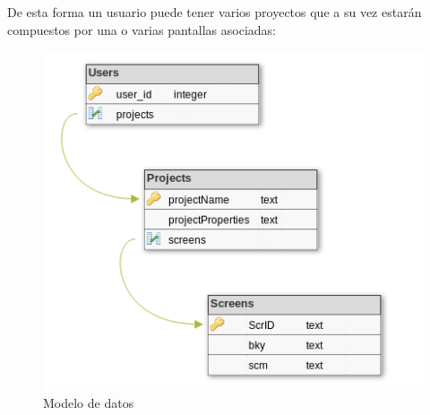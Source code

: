 \documentclass[a4paper, 12pt]{book}
\begin{document}
De esta forma un usuario puede tener varios proyectos que a su vez estarán compuestos por una o varias pantallas asociadas:
\begin{figure}[H]
  	\centering
	\includegraphics[width=0.80\linewidth, keepaspectratio]{img/databasediagram}
	\caption{Modelo de datos}
	\label{fig:databasemodel}
\end{figure}


\end{document}
